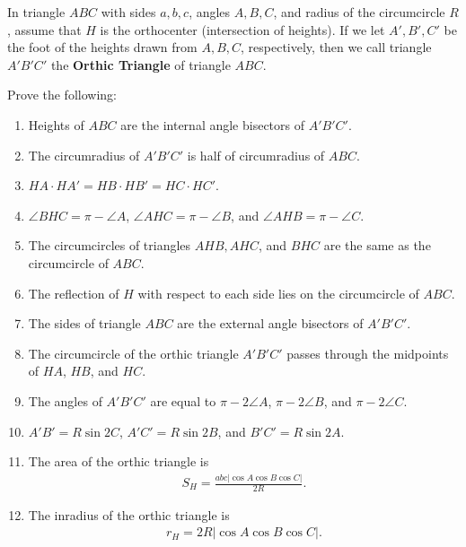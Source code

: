 \begin{tcolorbox}
    \begin{question}[name=Trigonometry of the Orthic Triangle]
        In triangle $ABC$ with sides $a,b,c$, angles $A,B,C$, and radius of the circumcircle $R$, assume that $H$ is the orthocenter (intersection of heights). If we let $A',B',C'$ be the foot of the heights drawn from $A,B,C$, respectively, then we call triangle $A'B'C'$ the \textbf{Orthic Triangle} of triangle $ABC$. 
        
        Prove the following:
        \begin{enumerate}
            \item Heights of $ABC$ are the internal angle bisectors of $A'B'C'$.
            \item The circumradius of $A'B'C'$ is half of circumradius of $ABC$.
            \item $HA \cdot HA' = HB \cdot HB' = HC \cdot HC'$.
            \item $\angle BHC = \pi - \angle A$, $\angle AHC = \pi - \angle B$, and $\angle AHB = \pi - \angle C$.
            \item The circumcircles of triangles $AHB, AHC$, and $BHC$ are the same as the circumcircle of $ABC$.
            \item The reflection of $H$ with respect to each side lies on the circumcircle of $ABC$.
            \item The sides of triangle $ABC$ are the external angle bisectors of  $A'B'C'$.
            \item The circumcircle of the orthic triangle $A'B'C'$ passes through the midpoints of $HA$, $HB$, and $HC$.
            \item The angles of $A'B'C'$ are equal to $\pi - 2\angle A$, $\pi - 2\angle B$, and $\pi - 2\angle C$.
            \item $A'B'= R\sin 2C$, $A'C'=R\sin 2B$, and $B'C'=R\sin 2A$.
            \item The area of the orthic triangle is
            \begin{align*}
                S_H = \frac{abc|\cos A \cos B \cos C|}{2R}.
            \end{align*}
            \item The inradius of the orthic triangle is
            \begin{align*}
                r_H = 2R |\cos A \cos B \cos C|.
            \end{align*}
        \end{enumerate}
    \end{question}
\end{tcolorbox}

